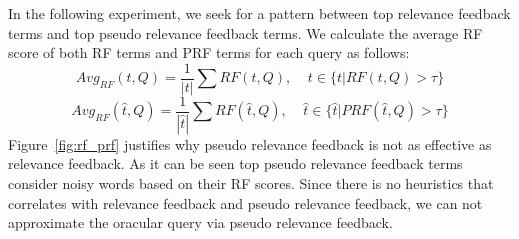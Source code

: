 In the following experiment, we seek for a pattern between top relevance feedback terms and top pseudo relevance feedback terms. We calculate the average RF score of both RF terms and PRF terms for each query as follows:
\begin{equation}
Avg_{RF}(t, Q) = \frac{1}{|t|}\sum {RF}(t, Q), \;\;\;\; t\in \{t | RF(t, Q)>\tau\}
\end{equation}
\begin{equation}
Avg_{RF}(\hat{t}, Q) = \frac{1}{|\hat{t}|}\sum {RF}(\hat{t}, Q), \;\;\;\; \hat{t}\in \{\hat{t} | PRF(\hat{t}, Q)>\tau\} 
\end{equation}
Figure~\ref{fig:rf_prf} justifies why pseudo relevance feedback is not as effective as relevance feedback. As it can be seen top pseudo relevance feedback terms consider noisy words based on their RF scores. Since there is no heuristics that correlates with relevance feedback and pseudo relevance feedback, we can not approximate the oracular query via pseudo relevance feedback.   
